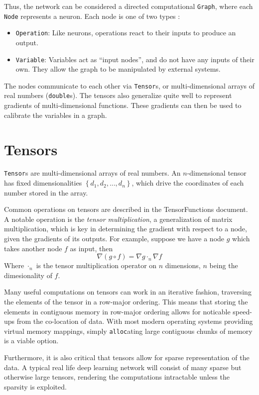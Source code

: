 \documentclass{article}
\begin{document}
  Thus, the network can be considered a directed computational \texttt{Graph},
  where each \texttt{Node} represents a neuron.
  Each node is one of two types :
  \begin{itemize}
    \item \texttt{Operation}: 
      Like neurons, operations react to their inputs to produce an output.
    \item \texttt{Variable}:
      Variables act as ``input nodes'', and do not have any inputs of their own.
      They allow the graph to be manipulated by external systems.
  \end{itemize}
  
  The nodes communicate to each other via \texttt{Tensor}s, 
  or multi-dimensional arrays of real numbers (\texttt{double}s).
  The tensors also generalize quite well to represent gradients of multi-dimensional
  functions. 
  These gradients can then be used to calibrate the variables in a graph.
  
\section{Tensors}
  \texttt{Tensor}s are multi-dimensional arrays of real numbers.
  An $n$-dimensional tensor has fixed dimensionalities 
  $\left\{d_1, d_2, ..., d_n\right\}$, which drive the coordinates
  of each number stored in the array.
  
  Common operations on tensors are described in the TensorFunctions document.
  A notable operation is the \emph{tensor multiplication},
  a generalization of matrix multiplication,
  which is key in determining the gradient with respect to a node,
  given the gradients of its outputs.
  For example, suppose we have a node $g$ 
  which takes another node $f$ as input, 
  then
  \[ \nabla (g \circ f) = \nabla g \cdot_n \nabla f \]
  Where $\cdot_n$ is the tensor multiplication operator on $n$ dimensions,
  $n$ being the dimesionality of $f$.
  
  Many useful computations on tensors can work in an iterative fashion,
  traversing the elements of the tensor in a row-major ordering.
  This means that storing the elements in contiguous memory in row-major
  ordering allows for noticable speed-ups from the co-location of data.
  With most modern operating systems providing virtual memory mappings,
  simply \texttt{alloc}ating large contiguous chunks of memory 
  is a viable option.
  
  
  Furthermore, it is also critical that tensors allow for 
  sparse representation of the data.
  A typical real life deep learning network will consist of
  many sparse but otherwise large tensors,
  rendering the computations intractable unless the sparsity is exploited.
\end{document}
